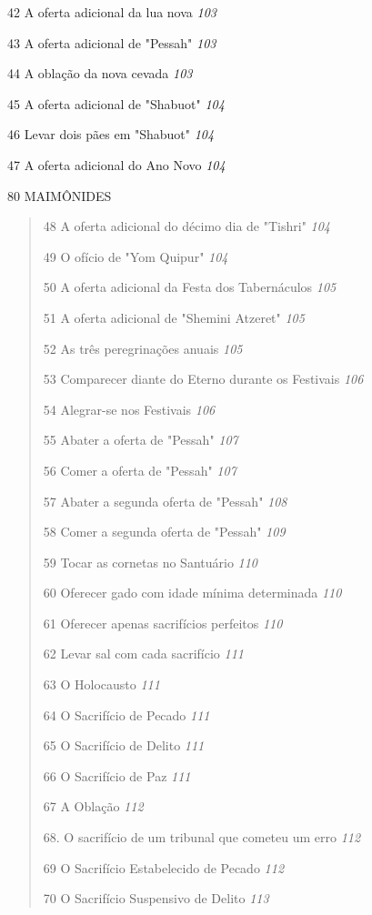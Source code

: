 42 A oferta adicional da lua nova \emph{103}

43 A oferta adicional de "Pessah" \emph{103}

44 A oblação da nova cevada \emph{103}

45 A oferta adicional de "Shabuot" \emph{104}

46 Levar dois pães em "Shabuot" \emph{104}

47 A oferta adicional do Ano Novo \emph{104}

80 MAIMÔNIDES

\begin{quote}
48 A oferta adicional do décimo dia de "Tishri" \emph{104}

49 O ofício de "Yom Quipur" \emph{104}

50 A oferta adicional da Festa dos Tabernáculos \emph{105}

51 A oferta adicional de "Shemini Atzeret" \emph{105}

52 As três peregrinações anuais \emph{105}

53 Comparecer diante do Eterno durante os Festivais \emph{106}

54 Alegrar-se nos Festivais \emph{106}

55 Abater a oferta de "Pessah" \emph{107}

56 Comer a oferta de "Pessah" \emph{107}

57 Abater a segunda oferta de "Pessah" \emph{108}

58 Comer a segunda oferta de "Pessah" \emph{109}

59 Tocar as cornetas no Santuário \emph{110}

60 Oferecer gado com idade mínima determinada \emph{110}

61 Oferecer apenas sacrifícios perfeitos \emph{110}

62 Levar sal com cada sacrifício \emph{111}

63 O Holocausto \emph{111}

64 O Sacrifício de Pecado \emph{111}

65 O Sacrifício de Delito \emph{111}

66 O Sacrifício de Paz \emph{111}

67 A Oblação \emph{112}

68. O sacrifício de um tribunal que cometeu um erro \emph{112}

69 O Sacrifício Estabelecido de Pecado \emph{112}

70 O Sacrifício Suspensivo de Delito \emph{113}


\end{quote}

